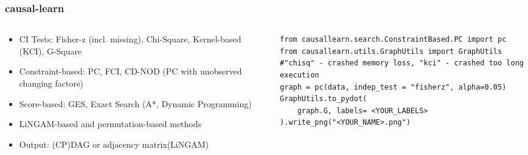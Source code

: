 \documentclass[t,24pt,aspectratio=169]{beamer}
\begin{document}
\begin{frame}[fragile]
\frametitle{causal-learn}

\begin{columns}
    \begin{column}{0.5\textwidth}
        \begin{itemize}
            \item CI Tests: Fisher-z (incl. missing), Chi-Square, Kernel-based (KCI), G-Square
            \item Constraint-based: PC, FCI, CD-NOD (PC with unobserved changing factors)
            \item Score-based: GES, Exact Search (A*, Dynamic Programming)
            \item LiNGAM-based and permutation-based methods
            \item Output: (CP)DAG or adjacency matrix(LiNGAM)
        \end{itemize}
    \end{column}

    \begin{column}{0.5\textwidth}

        \begin{lstlisting}
from causallearn.search.ConstraintBased.PC import pc
from causallearn.utils.GraphUtils import GraphUtils
#"chisq" - crashed memory loss, "kci" - crashed too long execution
graph = pc(data, indep_test = "fisherz", alpha=0.05)
GraphUtils.to_pydot(
    graph.G, labels= <YOUR_LABELS>
).write_png("<YOUR_NAME>.png")

            
        \end{lstlisting}
    \end{column}
\end{columns}

\end{frame}
\end{document}

